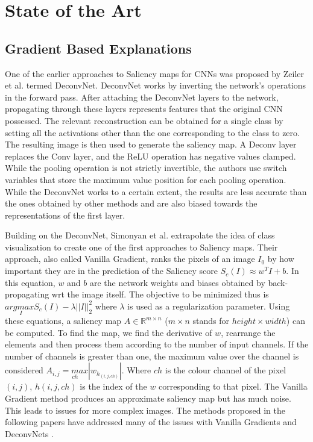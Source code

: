\chapter{State of the Art}
\section{Gradient Based Explanations}
One of the earlier approaches to Saliency maps for CNNs was proposed by Zeiler et al. \cite{zeilerVisualizingUnderstandingConvolutional2013} termed DeconvNet. DeconvNet works by inverting the network's operations in the forward pass. After attaching the DeconvNet layers to the network, propagating through these layers represents features that the original CNN possessed. The relevant reconstruction can be obtained for a single class by setting all the activations other than the one corresponding to the class to zero. The resulting image is then used to generate the saliency map. A Deconv layer replaces the Conv layer, and the ReLU operation has negative values clamped. While the pooling operation is not strictly invertible, the authors use switch variables that store the maximum value position for each pooling operation. While the DeconvNet works to a certain extent, the results are less accurate than the ones obtained by other methods and are also biased towards the representations of the first layer.

Building on the DeconvNet, Simonyan et al. \cite{simonyanDeepConvolutionalNetworks2014} extrapolate the idea of class visualization to create one of the first approaches to Saliency maps. Their approach, also called Vanilla Gradient, ranks the pixels of an image $I_{0}$ by how important they are in the prediction of the Saliency score $S_{c}(I) \approx w^{T}I + b$. In this equation, $w$ and $b$ are the network weights and biases obtained by back-propagating wrt the image itself. The objective to be minimized thus is $arg \underset{I}max S_{c}(I) - \lambda||I||^{2}_{2}$ where $\lambda$ is used as a regularization parameter. Using these equations, a saliency map $A \in \mathbb{R}^{m \times n}$ ($m \times n$ stands for $height \times width$) can be computed. To find the map, we find the derivative of $w$, rearrange the elements and then process them according to the number of input channels. If the number of channels is greater than one, the maximum value over the channel is considered $A_{i,j}= \underset{ch}max |w_{h_{(i,j, ch)}}|$. Where $ch$ is the colour channel of the pixel $(i,j)$, $h(i,j, ch)$ is the index of the $w$ corresponding to that pixel. The Vanilla Gradient method produces an approximate saliency map but has much noise. This leads to issues for more complex images. The methods proposed in the following papers have addressed many of the issues with Vanilla Gradients and DeconvNets \cite{zeilerVisualizingUnderstandingConvolutional2013}.

